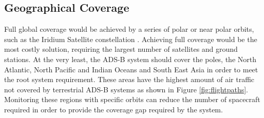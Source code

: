\subsection{Geographical Coverage}
Full global coverage would be achieved by a series of polar or near polar orbits, such as the Iridium Satellite constellation \cite{iridium_ICAO_man,iridium:an_overview1998}. Achieving full coverage would be the most costly solution, requiring the largest number of satellites and ground stations. At the very least, the ADS-B system should cover the poles, the North Atlantic, North Pacific and Indian Oceans and South East Asia in order to meet the root system requirement. These areas have the highest amount of air traffic not covered by terrestrial ADS-B systems as shown in Figure \ref{fig:flightpaths}.  Monitoring these regions with specific orbits can reduce the number of spacecraft required in order to provide the coverage gap required by the system.

